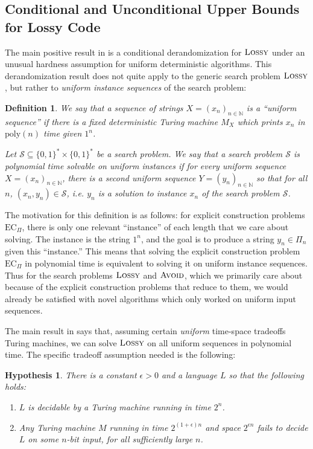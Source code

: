 \documentclass[11pt]{article}
\newtheorem{definition}{Definition}
\newtheorem{hypothesis}{Hypothesis}
\newcommand{\todo}[1]{\textcolor{red}{TODO: #1}}
\newcommand{\B}{\{0,1\}}
\newcommand{\poly}{\mathrm{poly}}
\newcommand{\ec}{\mathrm{EC}_\Pi}
\newcommand{\avoid}{\textsc{Avoid}}
\newcommand{\lossy}{\textsc{Lossy}}
\begin{document}
\subsection{Conditional and Unconditional Upper Bounds for Lossy Code}\label{sec:time-space}

The main positive result in \cite{Korten2} is a conditional derandomization for $\lossy$ under an unusual hardness assumption for uniform deterministic algorithms. This derandomization result does not quite apply to the generic search problem $\lossy$, but rather to \emph{uniform instance sequences} of the search problem:
\begin{definition}
 We say that a sequence of strings $X=(x_n)_{n \in \mathbb{N}}$ is a ``uniform sequence'' if there is a fixed deterministic Turing machine $M_X$ which prints $x_n$ in $\poly(n)$ time given $1^n$.

Let $\mathcal{S} \subseteq \B^* \times \B^*$ be a search problem. We say that a search problem $\mathcal{S}$ is polynomial time solvable on uniform instances if for every uniform sequence $X = (x_n)_{n \in \mathbb{N}}$, there is a second uniform sequence $Y=(y_n)_{n \in \mathbb{N}}$ so that for all $n$, $(x_n,y_n) \in \mathcal{S}$, i.e. $y_n$ is a solution to instance $x_n$ of the search problem $\mathcal{S}$.
\end{definition}
The motivation for this definition is as follows: for explicit construction problems $\ec$, there is only one relevant ``instance'' of each length that we care about solving. The instance is the string $1^n$, and the goal is to produce a string $y_n \in \Pi_n$ given this ``instance.'' This means that solving the explicit construction problem $\ec$ in polynomial time is equivalent to solving it on uniform instance sequences. Thus for the search problems $\lossy$ and $\avoid$, which we primarily care about because of the explicit construction problems that reduce to them, we would already be satisfied with novel algorithms which only worked on uniform input sequences.

The main result in \cite{Korten2} says that, assuming certain \emph{uniform}  time-space tradeoffs Turing machines, we can solve $\lossy$ on all uniform sequences in polynomial time. The specific tradeoff assumption needed is the following:
\begin{hypothesis}\label{hyp:tradeoff}
There is a constant $\epsilon > 0$ and a language $L$ so that the following holds:

\begin{enumerate}
	\item $L$ is decidable by a Turing machine running in time $2^{n}$.
	\item Any Turing machine $M$ running in time $2^{(1+\epsilon)n}$ and space $2^{\epsilon n}$ fails to decide $L$ on some $n$-bit input, for all sufficiently large $n$.
\end{enumerate}
\end{hypothesis}
\end{document}

